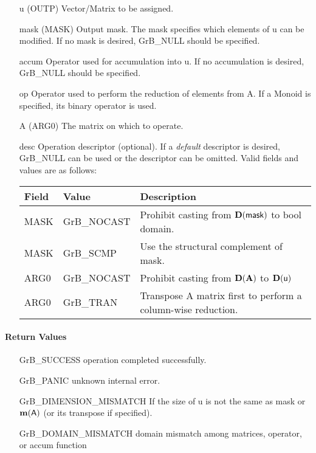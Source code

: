 \begin{itemize}[leftmargin=1.1in]
    \item[{\sf u}]   ({\sf OUTP}) Vector/Matrix to be assigned.

    \item[{\sf mask}] ({\sf MASK}) Output mask. The mask specifies which elements
    of {\sf u} can be modified. If no mask is desired, {\sf GrB\_NULL} should be specified.

    \item[{\sf accum}] Operator used for accumulation into {\sf u}.  If no accumulation
                        is desired, {\sf GrB\_NULL} should be specified.

    \item[{\sf op}]    Operator used to perform the reduction of elements from {\sf A}.  If a Monoid is specified, its binary operator is used.
    \item[{\sf A}]     ({\sf ARG0}) The matrix on which to operate.

    \item[{\sf desc}]   Operation descriptor (optional). If a
    \emph{default} descriptor is desired, {\sf GrB\_NULL} can be
    used or the descriptor can be omitted.  Valid fields and values are as follows: \\
    \begin{tabular}{lll}
    Field  & Value & Description \\
    \hline
    {\sf MASK} & {\sf GrB\_NOCAST} & Prohibit casting from $\bold{D}({\sf mask})$ to {\sf bool} domain. \\
    {\sf MASK} & {\sf GrB\_SCMP} & Use the structural complement of {\sf mask}. \\
    {\sf ARG0} & {\sf GrB\_NOCAST} & Prohibit casting from $\bold{D}({\bf A})$ to $\bold{D}({\sf u})$ \\
    {\sf ARG0} & {\sf GrB\_TRAN} & Transpose {\sf A} matrix first to perform a 
    column-wise reduction. \\
    \end{tabular}

\end{itemize}


\paragraph{Return Values}

\begin{itemize}[leftmargin=2.1in]
\item[{\sf GrB\_SUCCESS}]    operation completed successfully.
\item[{\sf GrB\_PANIC}]      unknown internal error.
\item[{\sf GrB\_DIMENSION\_MISMATCH}]            
        If the size of {\sf u} is not the same as {\sf mask} or $\bold{m}({\sf A})$ (or its transpose if specified).
\item[{\sf GrB\_DOMAIN\_MISMATCH}]  
        domain mismatch among matrices, operator, or
        accum function 
\end{itemize}


